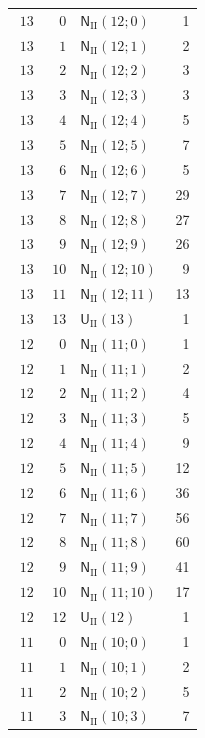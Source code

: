 \documentclass[10pt]{article}
\begin{document}
\begin{longtable}{@{}r r >{\RaggedRight\arraybackslash}p{0.48\linewidth} r@{}}
$13$ & $0$ & $\mathsf N_{\mathrm{II}}(12;0)$ & 1 \\
$13$ & $1$ & $\mathsf N_{\mathrm{II}}(12;1)$ & 2 \\
$13$ & $2$ & $\mathsf N_{\mathrm{II}}(12;2)$ & 3 \\
$13$ & $3$ & $\mathsf N_{\mathrm{II}}(12;3)$ & 3 \\
$13$ & $4$ & $\mathsf N_{\mathrm{II}}(12;4)$ & 5 \\
$13$ & $5$ & $\mathsf N_{\mathrm{II}}(12;5)$ & 7 \\
$13$ & $6$ & $\mathsf N_{\mathrm{II}}(12;6)$ & 5 \\
$13$ & $7$ & $\mathsf N_{\mathrm{II}}(12;7)$ & 29 \\
$13$ & $8$ & $\mathsf N_{\mathrm{II}}(12;8)$ & 27 \\
$13$ & $9$ & $\mathsf N_{\mathrm{II}}(12;9)$ & 26 \\
$13$ & $10$ & $\mathsf N_{\mathrm{II}}(12;10)$ & 9 \\
$13$ & $11$ & $\mathsf N_{\mathrm{II}}(12;11)$ & 13 \\
$13$ & $13$ & $\mathsf U_{\mathrm{II}}(13)$ & 1 \\
$12$ & $0$ & $\mathsf N_{\mathrm{II}}(11;0)$ & 1 \\
$12$ & $1$ & $\mathsf N_{\mathrm{II}}(11;1)$ & 2 \\
$12$ & $2$ & $\mathsf N_{\mathrm{II}}(11;2)$ & 4 \\
$12$ & $3$ & $\mathsf N_{\mathrm{II}}(11;3)$ & 5 \\
$12$ & $4$ & $\mathsf N_{\mathrm{II}}(11;4)$ & 9 \\
$12$ & $5$ & $\mathsf N_{\mathrm{II}}(11;5)$ & 12 \\
$12$ & $6$ & $\mathsf N_{\mathrm{II}}(11;6)$ & 36 \\
$12$ & $7$ & $\mathsf N_{\mathrm{II}}(11;7)$ & 56 \\
$12$ & $8$ & $\mathsf N_{\mathrm{II}}(11;8)$ & 60 \\
$12$ & $9$ & $\mathsf N_{\mathrm{II}}(11;9)$ & 41 \\
$12$ & $10$ & $\mathsf N_{\mathrm{II}}(11;10)$ & 17 \\
$12$ & $12$ & $\mathsf U_{\mathrm{II}}(12)$ & 1 \\
$11$ & $0$ & $\mathsf N_{\mathrm{II}}(10;0)$ & 1 \\
$11$ & $1$ & $\mathsf N_{\mathrm{II}}(10;1)$ & 2 \\
$11$ & $2$ & $\mathsf N_{\mathrm{II}}(10;2)$ & 5 \\
$11$ & $3$ & $\mathsf N_{\mathrm{II}}(10;3)$ & 7 \\

\end{longtable}
\end{document}
